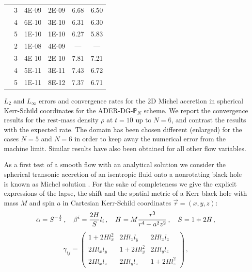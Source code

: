 \begin{margintable}
{\begin{tabular}{ c r  cccc  }
				\\
				&3	&  4E-09	& 2E-09		&  6.68	& 6.50	 \\
				&4	&  6E-10	& 3E-10		&  6.31	& 6.30	\\
				&5	&  1E-10	& 1E-10		&  6.27	& 5.83	 \\ 
				\cline{2-6}
				\hline
				\multirow{4}{*}{\rotatebox{90}{{DG-$\mathbb{P}_6$}}}
				&2	& 1E-08	& 4E-09	&   ---	&  ---	\\%
				&3	& 4E-10	& 2E-10	&  7.81	& 7.21	 \\
				&4	& 5E-11	& 3E-11	&  7.43	& 6.72	\\
				&5	& 1E-11	& 8E-12	&  7.37	& 6.71	\\
				\cline{2-6}
				\hline	
			\end{tabular}
	}%
	\caption[
	Convergence table for 2D Michel accretion
	]{ $L_2$ and $L_\infty$ errors and
		convergence rates for the 2D Michel accretion in spherical
		Kerr-Schild coordinates for the ADER-DG-$\mathbb{P}_N$ scheme. We
		report the convergence results for the rest-mass density $\rho$ at
		$t=10$ up to $N=6$, and contrast the results with the expected
		rate. The domain has been chosen different (enlarged) for the cases
		$N=5$ and $N=6$ in order to keep away the numerical error from the
		machine limit. Similar results have also been obtained for all other
		flow variables.}\label{tab:CTMichel2D} 
\end{margintable}
%
As a first test of a smooth flow with an analytical solution we consider
the spherical transonic accretion of an isentropic fluid onto a
nonrotating black hole is known as {Michel solution}
\citep{Michel72}. For the sake of
completeness we give the explicit expressions of the lapse, the shift and
the spatial metric of a Kerr black hole with mass $M$ and spin $a$ in
{Cartesian} Kerr-Schild coordinates $\vec r = (x,y,z)$:
%
\begin{equation}
  \alpha = S^{-\frac{1}{2}}\,, \quad \beta^i = \frac{2 H}{S} l_i\,, \quad H = M
  \frac{r^3}{r^4 + a^2 z^2}\,, \quad S = 1 + 2 H\,,
\end{equation}
\begin{equation} 	
	\gamma_{ij} = \left( \begin{array}{ccc} 1 + 2 H l_x^2 & 2 H l_x
          l_y & 2 H l_x l_z \\ 2 H l_x l_y & 1 + 2 H l_y^2 & 2 H l_y l_z
          \\ 2 H l_x l_z & 2 H l_y l_z & 1 + 2 H l_z^2
	\end{array} \right)\,,
	\label{eq.kerr.metric}
\end{equation}
